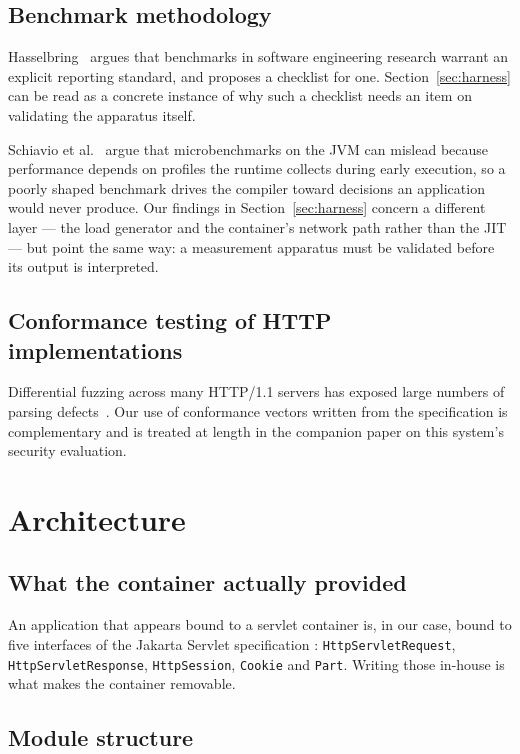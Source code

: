\documentclass[preprint,12pt]{elsarticle}
\begin{document}
\subsection{Benchmark methodology}

Hasselbring~\cite{hasselbring2021} argues that benchmarks in software
engineering research warrant an explicit reporting standard, and proposes a
checklist for one. Section~\ref{sec:harness} can be read as a concrete
instance of why such a checklist needs an item on validating the apparatus
itself.

Schiavio et al.~\cite{schiavio2026} argue that microbenchmarks on the JVM can
mislead because performance depends on profiles the runtime collects during
early execution, so a poorly shaped benchmark drives the compiler toward
decisions an application would never produce. Our findings in
Section~\ref{sec:harness} concern a different layer --- the load generator and
the container's network path rather than the JIT --- but point the same way: a
measurement apparatus must be validated before its output is interpreted.

\subsection{Conformance testing of HTTP implementations}

Differential fuzzing across many HTTP/1.1 servers has exposed large numbers of
parsing defects~\cite{httpgarden}. Our use of conformance vectors written from
the specification is complementary and is treated at length in the companion
paper on this system's security evaluation.

\section{Architecture}
\label{sec:architecture}

\subsection{What the container actually provided}

An application that appears bound to a servlet container is, in our case, bound
to five interfaces of the Jakarta Servlet specification \cite{servlet61}: \texttt{HttpServletRequest}, \texttt{HttpServletResponse},
\texttt{HttpSession}, \texttt{Cookie} and \texttt{Part}. Writing those in-house
is what makes the container removable.

\subsection{Module structure}
\end{document}
